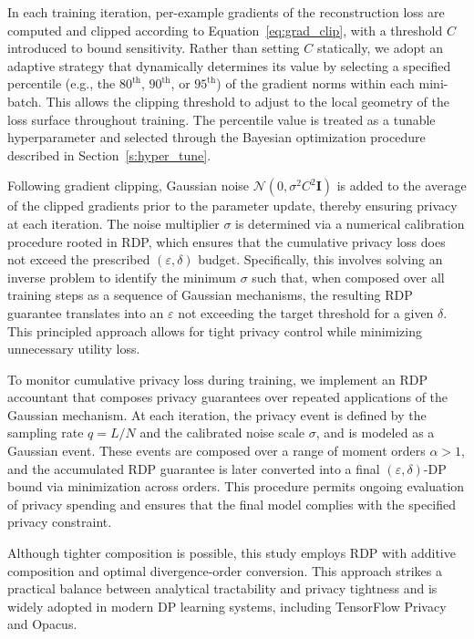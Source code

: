 

In each training iteration, per-example gradients of the reconstruction loss are computed and clipped according to Equation~\eqref{eq:grad_clip}, with a threshold \(C\) introduced to bound sensitivity. Rather than setting \(C\) statically, we adopt an adaptive strategy that dynamically determines its value by selecting a specified percentile (e.g., the \(80^{\text{th}}\), \(90^{\text{th}}\), or \(95^{\text{th}}\)) of the gradient norms within each mini-batch. This allows the clipping threshold to adjust to the local geometry of the loss surface throughout training. The percentile value is treated as a tunable hyperparameter and selected through the Bayesian optimization procedure described in Section~\ref{s:hyper_tune}.

Following gradient clipping, Gaussian noise \(\mathcal{N}(0, \sigma^2 C^2 \mathbf{I})\) is added to the average of the clipped gradients prior to the parameter update, thereby ensuring privacy at each iteration. The noise multiplier \(\sigma\) is determined via a numerical calibration procedure rooted in RDP, which ensures that the cumulative privacy loss does not exceed the prescribed \((\varepsilon, \delta)\) budget. Specifically, this involves solving an inverse problem to identify the minimum \(\sigma\) such that, when composed over all training steps as a sequence of Gaussian mechanisms, the resulting RDP guarantee translates into an \(\varepsilon\) not exceeding the target threshold for a given \(\delta\). This principled approach allows for tight privacy control while minimizing unnecessary utility loss.

To monitor cumulative privacy loss during training, we implement an RDP accountant that composes privacy guarantees over repeated applications of the Gaussian mechanism. At each iteration, the privacy event is defined by the sampling rate \(q = L/N\) and the calibrated noise scale \(\sigma\), and is modeled as a Gaussian event. These events are composed over a range of moment orders \(\alpha > 1\), and the accumulated RDP guarantee is later converted into a final \((\varepsilon, \delta)\)-DP bound via minimization across orders. This procedure permits ongoing evaluation of privacy spending and ensures that the final model complies with the specified privacy constraint.

Although tighter composition is possible, this study employs RDP with additive composition and optimal divergence-order conversion. This approach strikes a practical balance between analytical tractability and privacy tightness and is widely adopted in modern DP learning systems, including TensorFlow Privacy and Opacus.

